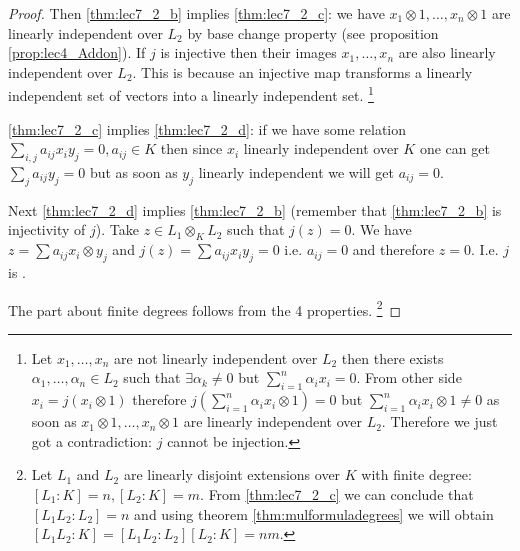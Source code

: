 \begin{theorem}
\begin{proof}
    Then \ref{thm:lec7_2_b} implies \ref{thm:lec7_2_c}: we have
    $x_1 \otimes 1, \dots, x_n \otimes 1$ are linearly independent
    over $L_2$ by base change property
    (see proposition \ref{prop:lec4_Addon}).
    If $j$ is injective then their images $x_1, \dots, x_n$
    are also linearly independent over $L_2$. This is because an
    injective map transforms a linearly independent set of vectors
    into a linearly independent set.
    \footnote{
      Let $x_1, \dots, x_n$ are not linearly independent over $L_2$
      then there exists $\alpha_1, \dots, \alpha_n \in L_2$ such that
      $\exists \alpha_k \ne 0$ but $\sum_{i=1}^n \alpha_i x_i =
      0$. From other side $x_i = j\left(x_i \otimes 1\right)$
      therefore $j\left(\sum_{i=1}^n \alpha_i x_i \otimes 1 \right) =
      0$ but $\sum_{i=1}^n \alpha_i x_i \otimes 1 \ne 0$ as soon as
      $x_1 \otimes 1, \dots, x_n \otimes 1$ are linearly independent
      over $L_2$. Therefore we just got a contradiction: $j$ cannot be
      injection. 
    }

    \ref{thm:lec7_2_c} implies \ref{thm:lec7_2_d}: if we have some
    relation $\sum_{i,j} a_{ij} x_i y_j = 0, a_{ij} \in K$ then since $x_i$
    linearly independent over $K$ one can get $\sum_{j} a_{ij} y_j = 0$
    but as soon as $y_j$ linearly independent we will get $a_{ij} =
    0$.

    Next \ref{thm:lec7_2_d} implies \ref{thm:lec7_2_b} (remember that
    \ref{thm:lec7_2_b} is injectivity of $j$). Take
    $z \in L_1 \otimes_K L_2$ such that $j\left(z\right) = 0$. We have
    $z = \sum a_{ij} x_i \otimes y_j$ and
    $j\left(z\right) = \sum a_{ij} x_i y_j = 0$ i.e. $a_{ij} = 0$ and
    therefore $z = 0$. I.e. $j$ is .

    The part about finite degrees follows from the 4 properties.
    \footnote{
      Let $L_1$ and $L_2$ are linearly disjoint extensions over $K$
      with finite degree: $\left[L_1:K\right] = n, \left[L_2:K\right]
      = m$. From \ref{thm:lec7_2_c} we can conclude that
      $\left[L_1 L_2:L_2\right] = n$ and using theorem
      \ref{thm:mulformuladegrees} we will obtain 
      $\left[L_1 L_2:K\right] = \left[L_1 L_2:L_2\right]
      \left[L_2 : K\right] = nm$.
    }
  \end{proof}
  \label{thm:lec7_2}
\end{theorem}

